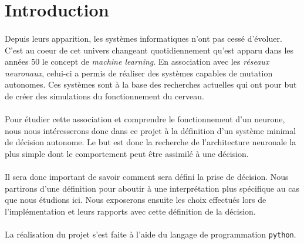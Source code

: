\section*{Introduction}

\paragraph{}
Depuis leurs apparition, les systèmes informatiques n'ont pas cessé d'évoluer.
C'est au coeur de cet univers changeant quotidiennement qu'est apparu dans les
années 50 le concept de {\em machine learning}. En association avec les
{\em réseaux neuronaux}, celui-ci a permis de réaliser des systèmes capables
de mutation autonomes. Ces systèmes sont à la base des recherches actuelles
qui ont pour but de créer des simulations du fonctionnement du cerveau.

\paragraph{}
Pour étudier cette association et comprendre le fonctionnement d'un neurone,
nous nous intéresserons donc dans ce projet à la définition d'un système minimal
de décision autonome.
Le but est donc la recherche de l'architecture neuronale la plus simple dont
le comportement peut être assimilé à une décision.

\paragraph{}
Il sera donc important de savoir comment sera défini la prise de décision. Nous
partirons d'une définition pour aboutir à une interprétation plus spécifique au
cas que nous étudions ici.
Nous exposerons ensuite les choix effectués lors de l'implémentation et leurs
rapports avec cette définition de la décision.

\paragraph{}
La réalisation du projet s'est faite à l'aide du langage de programmation
\verb!python!.


